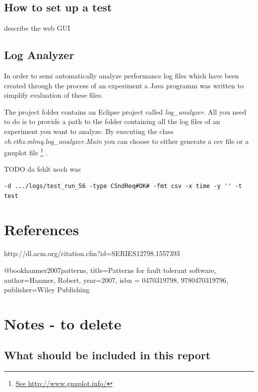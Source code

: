 \documentclass[a4paper]{article}
\begin{document}
\subsection{How to set up a test}
describe the web GUI

\subsection{Log Analyzer}

In order to semi automatically analyze performance log files which have been created through the process of an experiment a Java programm was written to simplify evaluation of these files.

The project folder contains an Eclipse project called \textit{log\_analyzer}. All you need to do is to provide a path to the folder containing all the log files of an experiment you want to analyze. By executing the class \textit{ch.ethz.mlmq.log\_analyzer.Main} you can choose to either generate a csv file or a gnuplot file \footnote{ \url{See http://www.gnuplot.info/} } .


TODO da fehlt noch was


\begin{verbatim}
-d .../logs/test_run_56 -type CSndReq#OK# -fmt csv -x time -y '' -t test
\end{verbatim}


\section{References}


http://dl.acm.org/citation.cfm?id=SERIES12798.1557393

@book{hanmer2007patterns,
  title={Patterns for fault tolerant software},
  author={Hanmer, Robert},
  year={2007},
  isbn = {0470319798, 9780470319796},
  publisher={Wiley Publishing}
}

%

\section{Notes - to delete}


\subsection{What should be included in this report }
\end{document}
